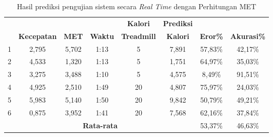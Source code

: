 \begin{longtable}{|c|c|c|c|c|c|c|c|}
  \caption{Hasil prediksi pengujian sistem secara \emph{Real Time} dengan Perhitungan MET}
  \label{tb:PengujianRealTimeAnalisaPrediksiPerhitungan}                                   \\
  \hline
  \rowcolor[HTML]{C0C0C0}
  & & & & \textbf{Kalori} & \textbf{Prediksi} & & \\
  \rowcolor[HTML]{C0C0C0}
  \multirow{-2}{*}{\textbf{Percobaan}} & \multirow{-2}{*}{\textbf{Kecepatan}} & \multirow{-2}{*}{\textbf{MET}} & \multirow{-2}{*}{\textbf{Waktu}} & \textbf{Treadmill} & \textbf{Kalori} & \multirow{-2}{*}{\textbf{Eror\%}} & \multirow{-2}{*}{\textbf{Akurasi\%}} \\
  \hline
  1   & 2,795   & 5,702    & 1:13    & 5    & 7,891   & 57,83\%      & 42,17\%   \\
  \hline
  2   & 4,533   & 1,320    & 1:13    & 5    & 1,751   & 64,97\%      & 35,03\%   \\
  \hline
  3   & 3,275   & 3,488    & 1:10    & 5    & 4,575   & 8,49\%       & 91,51\%   \\
  \hline
  4   & 4,925   & 2,510    & 1:49    & 20   & 4,807   & 75,97\%      & 24,03\%   \\
  \hline
  5   & 5,983   & 5,140    & 1:50    & 20   & 9,842   & 50,79\%      & 49,21\%   \\
  \hline
  6   & 0,875   & 3,952    & 1:41    & 20   & 7,568   & 62,16\%      & 37,84\%   \\
  \hline

  \multicolumn{6}{|c|}{\textbf{Rata-rata}} & 53,37\% & 46,63\% \\
  \hline
\end{longtable}